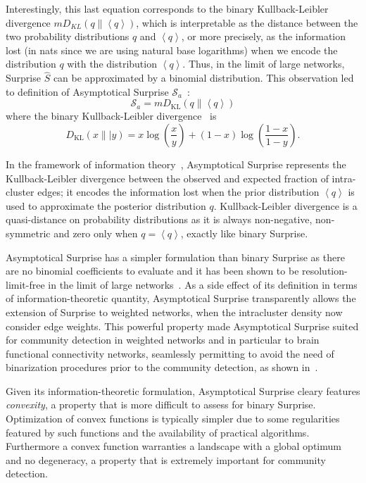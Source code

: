 Interestingly, this last equation corresponds to the binary Kullback-Leibler divergence $m D_{KL}(q \| \left< q \right>)$, which is interpretable as the distance between the two probability distributions $q$ and $\left<q\right>$, or more precisely, as the information lost (in nats since we are using natural base logarithms) when we encode the distribution $q$ with the distribution $\left< q\right>$. 
Thus, in the limit of large networks, Surprise $\hat{S}$ can be approximated by a binomial distribution. This observation led to definition of Asymptotical Surprise $\mathcal{S}_a$~\cite{traag2015}:
\begin{equation}\label{eq:asymptoticalsurprise}
\mathcal{S}_a = m D_{\textrm{KL}}\left( q \| \left< q \right> \right)
\end{equation}
where the binary Kullback-Leibler divergence~\cite{kullback1951} is $$D_{\textrm{KL}}(x\|| y) = x \log \left(\frac{x}{y} \right) + (1-x)\log \left (\frac{1-x}{1-y} \right).$$

In the framework of information theory~\cite{cover2006}, Asymptotical Surprise represents the Kullback-Leibler divergence between the observed and expected fraction of intra-cluster edges; it encodes the information lost when the prior distribution $\left <q \right >$ is used to approximate the posterior distribution $q$. Kullback-Leibler divergence is a quasi-distance on probability distributions as it is always non-negative, non-symmetric and zero only when $q=\left< q \right>$, exactly like binary Surprise.

Asymptotical Surprise has a simpler formulation than binary Surprise as there are no binomial coefficients to evaluate and it has been shown to be resolution-limit-free in the limit of large networks~\cite{traag2015}. As a side effect of its definition in terms of information-theoretic quantity, Asymptotical Surprise transparently allows the extension of Surprise to weighted networks, when the intracluster density now consider edge weights.
This powerful property made Asymptotical Surprise suited for community detection in weighted networks and in particular to brain functional connectivity networks, seamlessly permitting to avoid the need of binarization procedures prior to the community detection, as shown in~\cite{nicolini2017}.

Given its information-theoretic formulation, Asymptotical Surprise cleary features \emph{convexity}, a property that is more difficult to assess for binary Surprise. Optimization of convex functions is typically simpler due to some regularities featured by such functions and the availability of practical algorithms. Furthermore a convex function warranties a landscape with a global optimum and no degeneracy, a property that is extremely important for community detection.

